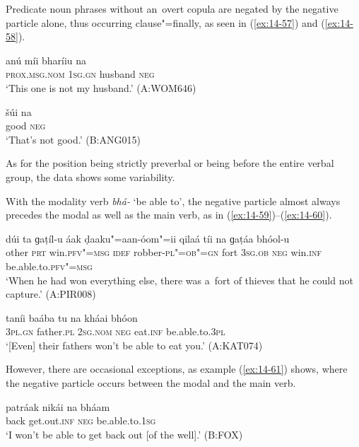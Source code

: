 Predicate noun phrases without an~overt copula are negated by the negative particle alone, thus occurring clause"=finally, as seen in (\ref{ex:14-57}) and (\ref{ex:14-58}).

\begin{exe}
\ex
\label{ex:14-57}
\gll anú míi bharíiu na \\
\textsc{prox.msg.nom} \textsc{1sg.gn} husband \textsc{neg} \\
\glt `This one is not my husband.' (A:WOM646)

\ex
\label{ex:14-58}
\gll šúi na \\
good \textsc{neg} \\
\glt `That's not good.' (B:ANG015)
\end{exe}

As for the position being strictly preverbal or being before the entire verbal group, the data shows some variability. 


With the modality verb \textit{bhá-} `be able to', the negative particle almost always precedes the modal as well as the main verb, as in (\ref{ex:14-59})--(\ref{ex:14-60}).

\begin{exe}
\ex
\label{ex:14-59}
\gll dúi ta ɡaṭíl-u áak ḍaaku"=aan-óom"=ii qilaá  tíi na ɡaṭáa bhóol-u \\
other \textsc{prt} win.\textsc{pfv"=msg} \textsc{idef} robber-\textsc{pl"=ob"=gn} fort  \textsc{3sg.ob} \textsc{neg} win.\textsc{inf} be.able.to.\textsc{pfv"=msg}  \\
\glt `When he had won everything else, there was a~fort of thieves that he could not capture.' (A:PIR008)

\ex
\label{ex:14-60}
\gll taníi baába tu na kháai bhóon \\
\textsc{3pl.gn} father.\textsc{pl} \textsc{2sg.nom} \textsc{neg} eat.\textsc{inf} be.able.to.\textsc{3pl} \\
\glt `[Even] their fathers won't be able to eat you.' (A:KAT074)
\end{exe}

However, there are occasional exceptions, as example (\ref{ex:14-61}) shows, where the negative particle occurs between the modal and the main verb.

\begin{exe}
\ex
\label{ex:14-61}
\gll patráak nikái na bháam \\
back get.out.\textsc{inf} \textsc{neg} be.able.to.\textsc{1sg} \\
\glt `I won't be able to get back out [of the well].' (B:FOX)
\end{exe}

